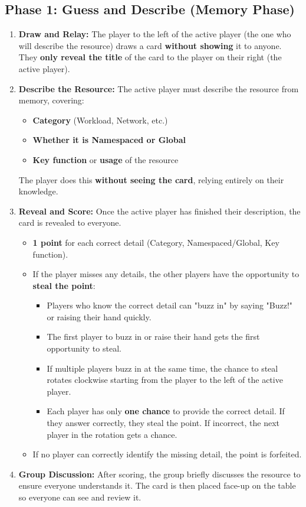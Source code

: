 \documentclass{article}
\begin{document}
\subsection*{Phase 1: Guess and Describe (Memory Phase)}
\begin{enumerate}[label=\arabic*.]
    \item \textbf{Draw and Relay:} The player to the left of the active player (the one who will describe the resource) draws a card \textbf{without showing} it to anyone. They \textbf{only reveal the title} of the card to the player on their right (the active player).
    
    \item \textbf{Describe the Resource:} The active player must describe the resource from memory, covering:
    \begin{itemize}
        \item \textbf{Category} (Workload, Network, etc.)
        \item \textbf{Whether it is Namespaced or Global}
        \item \textbf{Key function} or \textbf{usage} of the resource
    \end{itemize}
    The player does this \textbf{without seeing the card}, relying entirely on their knowledge.
    
    \item \textbf{Reveal and Score:} Once the active player has finished their description, the card is revealed to everyone.
    \begin{itemize}
        \item \textbf{1 point} for each correct detail (Category, Namespaced/Global, Key function).
        \item If the player misses any details, the other players have the opportunity to \textbf{steal the point}:
        \begin{itemize}
            \item Players who know the correct detail can "buzz in" by saying "Buzz!" or raising their hand quickly.
            \item The first player to buzz in or raise their hand gets the first opportunity to steal.
            \item If multiple players buzz in at the same time, the chance to steal rotates clockwise starting from the player to the left of the active player.
            \item Each player has only \textbf{one chance} to provide the correct detail. If they answer correctly, they steal the point. If incorrect, the next player in the rotation gets a chance.
        \end{itemize}
        \item If no player can correctly identify the missing detail, the point is forfeited.
    \end{itemize}
    
    \item \textbf{Group Discussion:} After scoring, the group briefly discusses the resource to ensure everyone understands it. The card is then placed face-up on the table so everyone can see and review it.
\end{enumerate}
\end{document}
